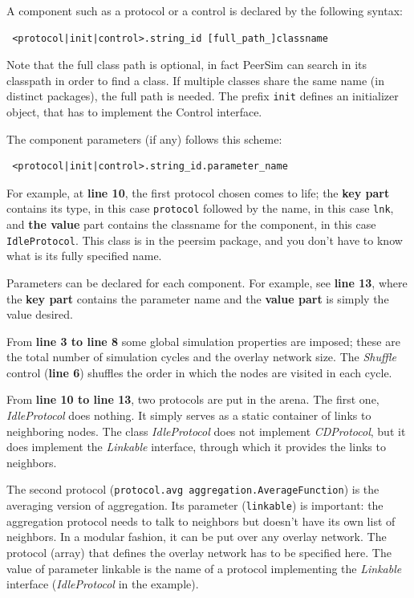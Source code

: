 \documentclass[a4paper,11pt]{article}
\begin{document}
A component such as a protocol or a control is declared by  the
following syntax:

\begin{verbatim} <protocol|init|control>.string_id [full_path_]classname
\end{verbatim}

Note that the full class path is optional, in fact PeerSim can search
in its classpath in order to find a class. If multiple classes share
the same name (in distinct packages), the full path is needed.
The prefix {\tt init} defines an initializer object, that has to implement
the Control interface.
  
The component parameters (if any) follows this scheme:

\begin{verbatim} <protocol|init|control>.string_id.parameter_name
\end{verbatim}

For example, at \textbf{line 10}, the first protocol chosen comes to life;
the \textbf{key part} contains its type, in this case {\tt protocol}
followed by the name, in this case {\tt lnk}, and \textbf{the
value} part contains the classname for the component, in this case
{\tt IdleProtocol}.
This class is in the peersim package, and you don't have to know what is
its fully specified name.

Parameters can be declared for each component.
For example, see \textbf{line 13}, where the \textbf{key part} contains the
parameter name and the \textbf{value part} is simply the value desired.

From \textbf{line 3 to line 8}
some global simulation properties are imposed; these are the total
number of simulation cycles and the overlay network size. The
\emph{Shuffle} control (\textbf{line 6}) shuffles the order in which the nodes
are visited in each cycle. 

From \textbf{line 10 to line 13}, two protocols are put in the arena.
The first one, \emph{IdleProtocol} does nothing.
It simply serves as a static container of links to neighboring nodes.
The class \emph{IdleProtocol} does not implement \emph{CDProtocol}, but it
does implement the \emph{Linkable} interface, through which it provides
the links to neighbors.

The second protocol (\texttt{protocol.avg aggregation.AverageFunction})
is the averaging version of aggregation. Its parameter (\texttt{linkable})
is important: the aggregation protocol needs to talk to neighbors
but doesn't have its own list of neighbors.
In a modular fashion, it can be put over any overlay network.
The protocol (array) that defines the overlay network has to be specified
here.
The value of parameter linkable is the name
of a protocol implementing  the \emph{Linkable} interface
(\emph{IdleProtocol}
in the example).
\end{document}
